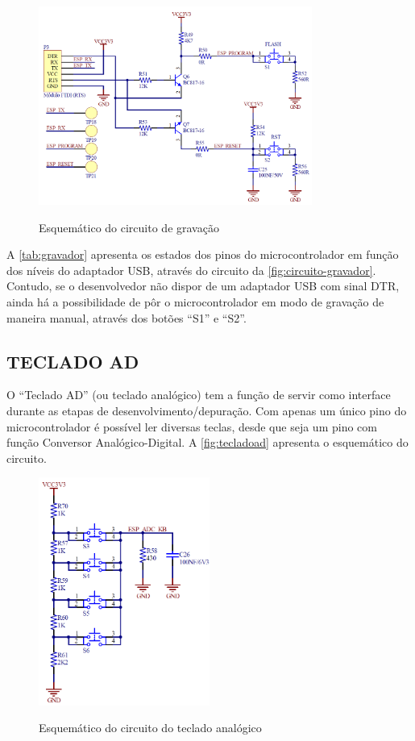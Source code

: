\begin{figure}[H]
    \centering
    \caption{Esquemático do circuito de gravação}
    \includegraphics[width=0.8\textwidth]{./dados/figuras/gravacao}
    \label{fig:circuito-gravador}
\end{figure}

A \autoref{tab:gravador} apresenta os estados dos pinos do microcontrolador em função dos níveis do adaptador USB, através do circuito da \autoref{fig:circuito-gravador}. Contudo, se o desenvolvedor não dispor de um adaptador USB com sinal DTR, ainda há a possibilidade de pôr o microcontrolador em modo de gravação de maneira manual, através dos botões ``S1'' e ``S2''.



\subsection{TECLADO AD}
\label{subsec:tecladoad}

O ``Teclado AD'' (ou teclado analógico) tem a função de servir como interface durante as etapas de desenvolvimento/depuração. Com apenas um único pino do microcontrolador é possível ler diversas teclas, desde que seja um pino com função Conversor Analógico-Digital. A \autoref{fig:tecladoad} apresenta o esquemático do circuito.

\begin{figure}[H]
    \centering
    \caption{Esquemático do circuito do teclado analógico}
    \includegraphics[width=0.5\textwidth]{./dados/figuras/tecladoad}
    \label{fig:tecladoad}
\end{figure}

